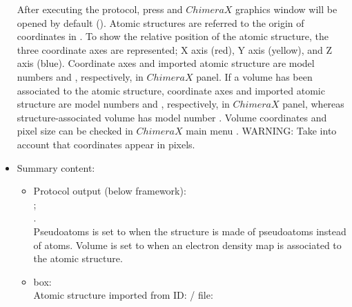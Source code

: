 \begin{itemize}
  After executing the protocol, press  and $ChimeraX$ graphics window will be opened by default (). 
  Atomic structures are referred to the origin of coordinates in \chimera. To show the relative position of the atomic structure, the three coordinate axes are represented; X axis (red), Y axis (yellow), and Z axis (blue). Coordinate axes and imported atomic structure are model numbers  and , respectively, in $ChimeraX$  panel. If a volume has been associated to the atomic structure, coordinate axes and imported atomic structure are model numbers  and , respectively, in $ChimeraX$  panel, whereas structure-associated volume has model number . Volume coordinates and pixel size can be checked in $ChimeraX$ main menu . WARNING: Take into account that coordinates appear in pixels.
   
   \item Summary content:
    \begin{itemize}
     \item Protocol output (below \scipion framework):\\ ;\\ .\\Pseudoatoms is set to  when the structure is made of pseudoatoms instead of atoms. Volume is set to  when an electron density map is associated to the atomic structure.
     \item {} box:\\Atomic structure imported from ID: / file: 
    \end{itemize}

  \end{itemize}
